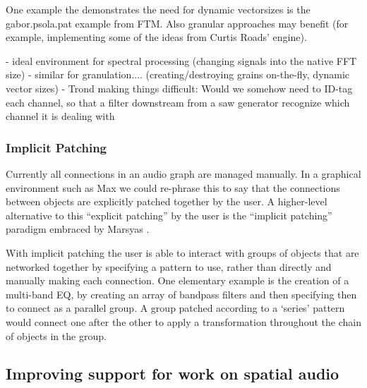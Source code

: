 \documentclass[twoside,a4paper]{article}
\begin{document}
One example the demonstrates the need for dynamic vectorsizes is the gabor.psola.pat example from FTM. 
Also granular approaches may benefit (for example, implementing some of the ideas from Curtis Roads' engine).

- ideal environment for spectral processing (changing signals into the native FFT size)
- similar for granulation.... (creating/destroying grains on-the-fly, dynamic vector sizes)
- Trond making things difficult: Would we somehow need to ID-tag each channel, so that a filter downstream from a saw generator recognize which channel it is dealing with




\subsubsection{Implicit Patching} %

Currently all connections in an audio graph are managed manually.  In a graphical environment such as Max we could re-phrase this to say that the connections between objects are explicitly patched together by the user.  A higher-level alternative to this ``explicit patching'' by the user is the ``implicit patching'' paradigm embraced by Marsyas \cite{Bray:2005}.

With implicit patching the user is able to interact with groups of objects that are networked together by specifying a pattern to use, rather than directly and manually making each connection.  
One elementary example is the creation of a multi-band EQ, by creating an array of bandpass filters and then specifying then to connect as a parallel group.  
A group patched according to a `series' pattern would connect one after the other to apply a transformation throughout the chain of objects in the group.





\subsection{Improving support for work on spatial audio} %
\end{document}
